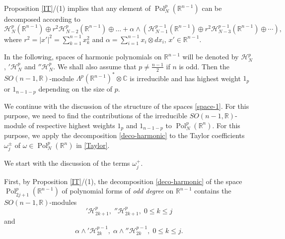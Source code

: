 \documentclass[a4paper,12pt,reqno]{amsart}
\numberwithin{theorem}{subsection}
\numberwithin{equation}{section}
\begin{document}
Proposition \ref{IT}/(1) implies that any element of ${\operatorname{Pol}}_N^p({\mathbb{R}}^{n-1})$ can
be decomposed according to
\begin{equation}\label{deco-harmonic}
   {\mathcal H}_N^p({\mathbb{R}}^{n-1}) \oplus r^2 {\mathcal H}_{N-2}^p({\mathbb{R}}^{n-1}) \oplus \dots + \alpha \wedge
   ({\mathcal H}_{N-1}^{p-1}({\mathbb{R}}^{n-1}) \oplus r^2 {\mathcal H}_{N-3}^{p-1}({\mathbb{R}}^{n-1}) \oplus \cdots),
\end{equation}
where $r^2 = |x'|^2 = \sum_{k=1}^{n-1} x_k^2$ and $\alpha = \sum_{i=1}^{n-1}
x_i \otimes dx_i$, $x' \in {\mathbb{R}}^{n-1}$.

In the following, spaces of harmonic polynomials on ${\mathbb{R}}^{n-1}$ will be denoted
by ${\mathcal H}^p_N$, ${'{\mathcal H}}^p_N$ and ${''{\mathcal H}}^p_N$. We shall also assume that $p \ne
\frac{n-1}{2}$ if $n$ is odd. Then the $SO(n-1,{\mathbb{R}})$-module
$\Lambda^p({\mathbb{R}}^{n-1})^* \otimes {\mathbb{C}}$ is irreducible and has highest weight $1_p$
or $1_{n-1-p}$ depending on the size of $p$.

We continue with the discussion of the structure of the spaces \eqref{space-1}.
For this purpose, we need to find the contributions of the irreducible
$SO(n-1,{\mathbb{R}})$-module of respective highest weights $1_p$ and $1_{n-1-p}$ to
${\operatorname{Pol}}^p_N({\mathbb{R}}^n)$. For this purpose, we apply the decomposition
\eqref{deco-harmonic} to the Taylor coefficients $\omega_j^\pm$ of $\omega \in
{\operatorname{Pol}}_N^p({\mathbb{R}}^n)$ in \eqref{Taylor}.

We start with the discussion of the terms $\omega_j^+$.

First, by Proposition \ref{IT}/(1), the decomposition \eqref{deco-harmonic} of
the space ${\operatorname{Pol}}^p_{2j+1}({\mathbb{R}}^{n-1})$ of polynomial forms of {\em odd degree} on
${\mathbb{R}}^{n-1}$ contains the $SO(n-1,{\mathbb{R}})$-modules
\begin{equation}\label{mod-1}
    {'{\mathcal H}}_{2k+1}^p, \; {''{\mathcal H}}_{2k+1}^p, \; 0 \le k \le j
\end{equation}
and
\begin{equation}\label{mod-2}
   \alpha \wedge {'{\mathcal H}}_{2k}^{p-1}, \; \alpha \wedge {''{\mathcal H}}_{2k}^{p-1}, \; 0 \le k \le j.
\end{equation}
\end{document}

